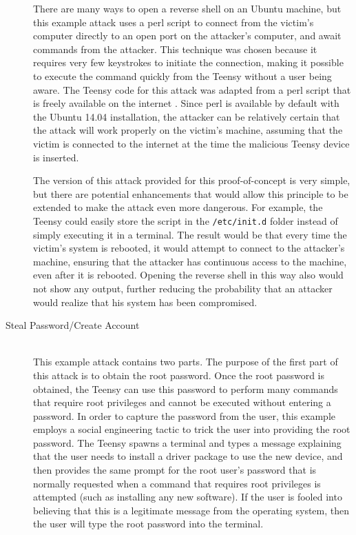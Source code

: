\documentclass[pagenumbers]{ieee}
\begin{document}
\begin{description}
There are many ways to open a reverse shell on an Ubuntu machine, but this example attack uses a perl script to connect from the victim's computer directly to an open port on the attacker's computer, and await commands from the attacker. This technique was chosen because it requires very few keystrokes to initiate the connection, making it possible to execute the command quickly from the Teensy without a user being aware.  The Teensy code for this attack was adapted from a perl script that is freely available on the internet \cite{pentest}. Since perl is available by default with the Ubuntu 14.04 installation, the attacker can be relatively certain that the attack will work properly on the victim's machine, assuming that the victim is connected to the internet at the time the malicious Teensy device is inserted. 

The version of this attack provided for this proof-of-concept is very simple, but there are potential enhancements that would allow this principle to be extended to make the attack even more dangerous. For example, the Teensy could easily store the script in the \texttt{/etc/init.d} folder instead of simply executing it in a terminal. The result would be that every time the victim's system is rebooted, it would attempt to connect to the attacker's machine, ensuring that the attacker has continuous access to the machine, even after it is rebooted.  Opening the reverse shell in this way also would not show any output, further reducing the probability that an attacker would realize that his system has been compromised. 

\item[Steal Password/Create Account] \hfill \\
This example attack contains two parts. The purpose of the first part of this attack is to obtain the root password. Once the root password is obtained, the Teensy can use this password to perform many commands that require root privileges and cannot be executed without entering a password.  In order to capture the password from the user, this example employs a social engineering tactic to trick the user into providing the root password. The Teensy spawns a terminal and types a message explaining that the user needs to install a driver package to use the new device, and then provides the same prompt for the root user's password that is normally requested when a command that requires root privileges is attempted (such as installing any new software). If the user is fooled into believing that this is a legitimate message from the operating system, then the user will type the root password into the terminal.


\end{description}
\end{document}
